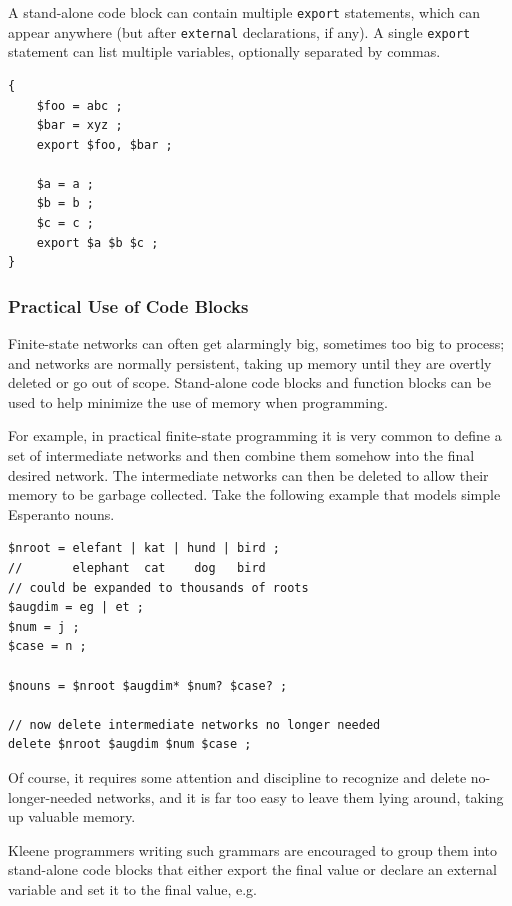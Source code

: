 \documentclass[letterpaper,12pt]{article}
\begin{document}
A stand-alone code block can contain multiple \texttt{export} statements,
which can appear anywhere (but after \texttt{external} declarations, if
any).  A single \texttt{export} statement can list multiple variables,
optionally separated by commas.

\begin{samepage}
\begin{Verbatim}[fontsize=\small]
{
    $foo = abc ;
    $bar = xyz ;
    export $foo, $bar ;

    $a = a ;
    $b = b ;
    $c = c ;
    export $a $b $c ;
}
\end{Verbatim}
\end{samepage}


\subsubsection{Practical Use of Code Blocks}

\label{sec:codeblock}

Finite-state networks can often get alarmingly big, sometimes too big to
process; and networks are normally persistent, taking up memory until
they are overtly deleted or go out of scope.  Stand-alone code blocks and function blocks
can be used to help minimize the use of memory when programming.  

For example, in practical finite-state programming it is very common to
define a set of intermediate networks and then combine them somehow into
the final desired network.  The intermediate networks can then be deleted
to allow their memory to be garbage collected.  Take the following
example that models simple Esperanto nouns.

\begin{Verbatim}[fontsize=\small]
$nroot = elefant | kat | hund | bird ;  
//       elephant  cat    dog   bird
// could be expanded to thousands of roots
$augdim = eg | et ;
$num = j ;
$case = n ;

$nouns = $nroot $augdim* $num? $case? ;

// now delete intermediate networks no longer needed
delete $nroot $augdim $num $case ;
\end{Verbatim}

\noindent
Of course, it requires some attention and discipline
to recognize and delete no-longer-needed networks,
and it is far too easy to leave them lying around, taking up valuable memory.  

Kleene programmers writing such grammars are encouraged to group them into stand-alone 
code blocks that
either export the final value or declare an external variable and set it to the final
value, e.g.
\end{document}

